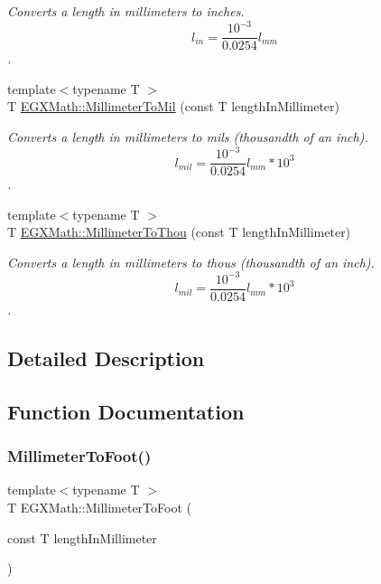 \begin{DoxyCompactItemize}
\begin{DoxyCompactList}\small\item\em Converts a length in millimeters to inches. \[ l_{in}= \frac{10^{-3}}{0.0254} l_{mm} \]. \end{DoxyCompactList}\item 
{\footnotesize template$<$typename T $>$ }\\T \mbox{\hyperlink{group___e_g_x_math-_conversions-_length_conversions-_s_i-_millimeter-_imperial_gaf811317f4ce575df4ff0329491e92fac}{E\+G\+X\+Math\+::\+Millimeter\+To\+Mil}} (const T length\+In\+Millimeter)
\begin{DoxyCompactList}\small\item\em Converts a length in millimeters to mils (thousandth of an inch). \[ l_{mil}= \frac{10^{-3}}{0.0254} l_{mm} * 10^{3} \]. \end{DoxyCompactList}\item 
{\footnotesize template$<$typename T $>$ }\\T \mbox{\hyperlink{group___e_g_x_math-_conversions-_length_conversions-_s_i-_millimeter-_imperial_ga099bde3b0f85fbbfbe91f0162a392835}{E\+G\+X\+Math\+::\+Millimeter\+To\+Thou}} (const T length\+In\+Millimeter)
\begin{DoxyCompactList}\small\item\em Converts a length in millimeters to thous (thousandth of an inch). \[ l_{mil}= \frac{10^{-3}}{0.0254} l_{mm} * 10^{3} \]. \end{DoxyCompactList}\end{DoxyCompactItemize}


\subsection{Detailed Description}


\subsection{Function Documentation}
\mbox{\label{group___e_g_x_math-_conversions-_length_conversions-_s_i-_millimeter-_imperial_ga96513545d32f8e86044a3a3551840023}} 
\subsubsection{\texorpdfstring{Millimeter\+To\+Foot()}{MillimeterToFoot()}}
{\footnotesize\ttfamily template$<$typename T $>$ \\
T E\+G\+X\+Math\+::\+Millimeter\+To\+Foot (\begin{DoxyParamCaption}\item[{const T}]{length\+In\+Millimeter }\end{DoxyParamCaption})}



